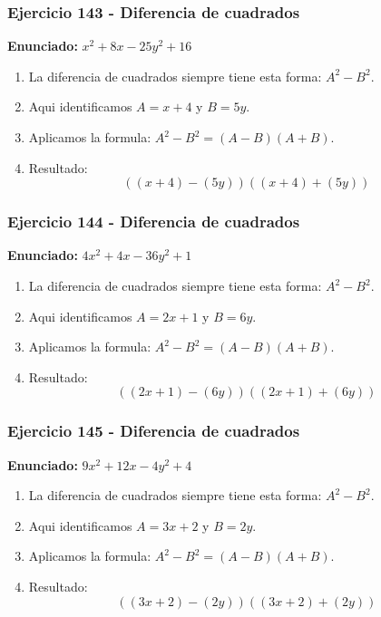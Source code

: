 \documentclass[11pt,a4paper]{article}
\begin{document}
\vspace{0.2cm}
\subsubsection*{Ejercicio 143 - Diferencia de cuadrados}
\textbf{Enunciado:} $ x^{2} + 8 x - 25 y^{2} + 16 $\par
\begin{enumerate}[leftmargin=2em]
\item La diferencia de cuadrados siempre tiene esta forma: \(A^2-B^2\).
\item Aqui identificamos \(A=x + 4\) y \(B=5 y\).
\item Aplicamos la formula: \(A^2-B^2=(A-B)(A+B)\).
\item Resultado: \[\boxed{\left(\left(x + 4\right)-\left(5 y\right)\right)\left(\left(x + 4\right)+\left(5 y\right)\right)}\]
\end{enumerate}

\vspace{0.2cm}
\subsubsection*{Ejercicio 144 - Diferencia de cuadrados}
\textbf{Enunciado:} $ 4 x^{2} + 4 x - 36 y^{2} + 1 $\par
\begin{enumerate}[leftmargin=2em]
\item La diferencia de cuadrados siempre tiene esta forma: \(A^2-B^2\).
\item Aqui identificamos \(A=2 x + 1\) y \(B=6 y\).
\item Aplicamos la formula: \(A^2-B^2=(A-B)(A+B)\).
\item Resultado: \[\boxed{\left(\left(2 x + 1\right)-\left(6 y\right)\right)\left(\left(2 x + 1\right)+\left(6 y\right)\right)}\]
\end{enumerate}

\vspace{0.2cm}
\subsubsection*{Ejercicio 145 - Diferencia de cuadrados}
\textbf{Enunciado:} $ 9 x^{2} + 12 x - 4 y^{2} + 4 $\par
\begin{enumerate}[leftmargin=2em]
\item La diferencia de cuadrados siempre tiene esta forma: \(A^2-B^2\).
\item Aqui identificamos \(A=3 x + 2\) y \(B=2 y\).
\item Aplicamos la formula: \(A^2-B^2=(A-B)(A+B)\).
\item Resultado: \[\boxed{\left(\left(3 x + 2\right)-\left(2 y\right)\right)\left(\left(3 x + 2\right)+\left(2 y\right)\right)}\]
\end{enumerate}
\end{document}
